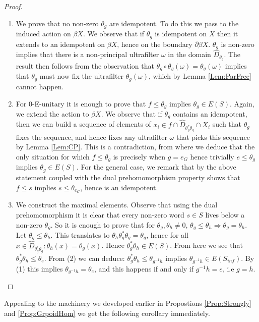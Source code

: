 \documentclass[11pt]{amsart}
\theoremstyle{plain}
\theoremstyle{definition}%
\theoremstyle{remark}%
\begin{document}
\begin{proof}
\hskip 1pt

\begin{enumerate}
\item We prove that no non-zero $\theta_{g}$ are idempotent. To do this we pass to the induced action on $\beta X$. We observe that if $\theta_{g}$ is idempotent on $X$ then it extends to an idempotent on $\beta X$, hence on the boundary $\partial \beta X$. $\theta_{g}$ is non-zero implies that there is a non-principal ultrafilter $\omega$ in the domain $\widehat{D}_{\theta_{g}}$. The result then follows from the observation that $\theta_{g}\circ \theta_{g} (\omega) = \theta_{g}(\omega)$ implies that $\theta_{g}$ must now fix the ultrafilter $\theta_{g}(\omega)$, which by Lemma \ref{Lem:ParFree} cannot happen.

\item For 0-E-unitary it is enough to prove that $f \leq \theta_{g}$ implies $\theta_{g} \in E(S)$. Again, we extend the action to $\beta X$. We observe that if $\theta_{g}$ contains an idempotent, then we can build a sequence of elements of $x_{i} \in f \cap \widehat{D}_{\theta_{g}^{*}\theta_{g}} \cap X_{i}$ such that $\theta_{g}$ fixes the sequence, and hence fixes any ultrafilter $\omega$ that picks this sequence by Lemma \ref{Lem:CP}. This is a contradiction, from where we deduce that the only situation for which $f \leq \theta_{g}$ is precisely when $g =e_{G}$ hence trivially $e \leq \theta_{g}$ implies $\theta_{g} \in E(S)$. For the general case, we remark that by the above statement coupled with the dual prehomomorphism property shows that $f \leq s$ implies $s \leq \theta_{e_{G}}$, hence is an idempotent.  

\item We construct the maximal elements. Observe that using the dual prehomomorphism it is clear that every non-zero word $s \in S$ lives below a non-zero $\theta_{g}$. So it is enough to prove that for $\theta_{g}, \theta_{h} \not = 0$, $\theta_{g} \leq \theta_{h} \Rightarrow \theta_{g}=\theta_{h}$. Let $\theta_{g} \leq \theta_{h}$. This translates to $\theta_{h}\theta_{g}^{*}\theta_{g} = \theta_{g}$, hence for all $x \in \widehat{D}_{\theta_{g}^{*}\theta_{g}}: \theta_{h}(x) = \theta_{g}(x)$. Hence $\theta_{g}^{*}\theta_{h} \in E(S)$. From here we see that $\theta_{g}^{*}\theta_{h} \leq \theta_{e}$. From (2) we can deduce: $\theta_{g}^{*}\theta_{h}\leq \theta_{g^{-1}h}$ implies $\theta_{g^{-1}h} \in E(S_{inf})$. By (1) this implies $\theta_{g^{-1}h}=\theta_{e}$, and this happens if and only if $g^{-1}h = e$, i.e $g=h$.
\end{enumerate}
\end{proof}
Appealing to the machinery we developed earlier in Propostions \ref{Prop:Strongly} and \ref{Prop:GrpoidHom} we get the following corollary immediately.
\end{document}
